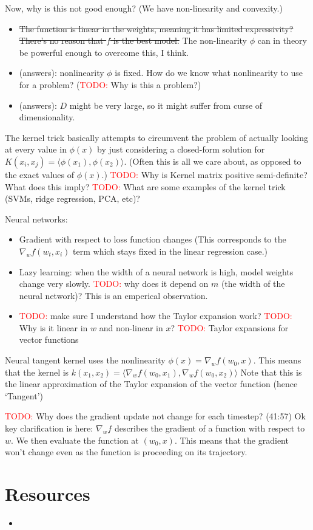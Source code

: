 \documentclass[answers,12pt]{exam}
\newcommand{\TODO}{\textcolor{red}{TODO:}}
\begin{document}
Now, why is this not good enough?
(We have non-linearity and convexity.)
\begin{itemize}
    \item \sout{The function is linear in the weights, meaning it has limited expressivity?
    There's no reason that $f$ is the best model.}
    The non-linearity $\phi$ can in theory be powerful enough to overcome this, I think.
    \item (answers): nonlinearity $\phi$ is fixed.
    How do we know what nonlinearity to use for a problem?
    (\TODO{} Why is this a problem?)
    \item (answers): $D$ might be very large, so it might suffer from curse of dimensionality.
\end{itemize}

The kernel trick basically attempts to circumvent the problem of actually looking at every value in $\phi(x)$ by just considering a closed-form solution for $K(x_i,x_j) = \langle \phi(x_1),\phi(x_2) \rangle$.
(Often this is all we care about, as opposed to the exact values of $\phi(x)$.)
\TODO{} Why is Kernel matrix positive semi-definite?
What does this imply?
\TODO{} What are some examples of the kernel trick (SVMs, ridge regression, PCA, etc)?

Neural networks:
\begin{itemize}
    \item Gradient with respect to loss function changes
    (This corresponds to the $\nabla_w f(w_t, x_i)$ term which stays fixed in the linear regression case.)
    \item Lazy learning: when the width of a neural network is high, model weights change very slowly.
    \TODO{} why does it depend on $m$ (the width of the neural network)?
    This is an emperical observation.
    \item \TODO{} make sure I understand how the Taylor expansion work?
    \TODO{} Why is it linear in $w$ and non-linear in $x$?
    \TODO{} Taylor expansions for vector functions
\end{itemize}

Neural tangent kernel uses the nonlinearity $\phi(x) = \nabla_w f(w_0,x)$.
This means that the kernel is $k(x_1,x_2) = \langle \nabla_w f(w_0,x_1), \nabla_w f(w_0,x_2) \rangle$
Note that this is the linear approximation of the Taylor expansion of the vector function (hence `Tangent')

\TODO{} Why does the gradient update not change for each timestep? (41:57)
Ok key clarification is here: $\nabla_w f$ describes the gradient of a function with respect to $w$.
We then evaluate the function at $(w_0,x)$.
This means that the gradient won't change even as the function is proceeding on its trajectory.

\section{Resources}
\begin{itemize}
    \item 
\end{itemize}
\end{document}
